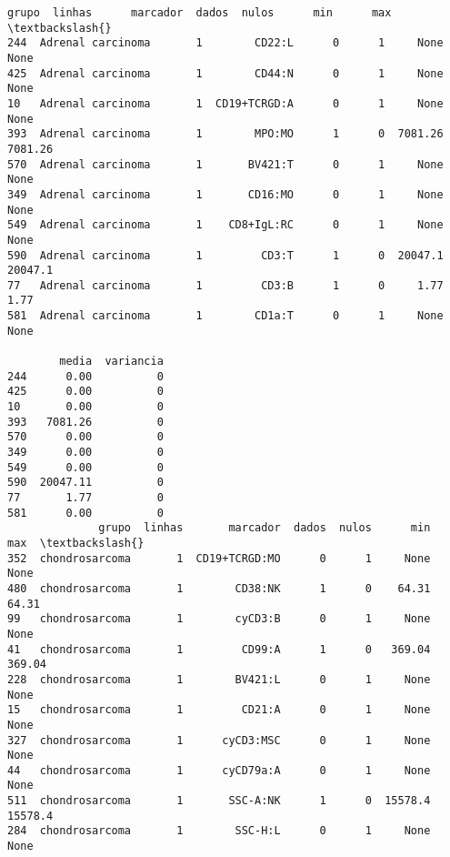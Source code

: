 \documentclass[11pt]{article}
\begin{document}
    \begin{Verbatim}[commandchars=\\\{\}]
                 grupo  linhas      marcador  dados  nulos      min      max  \textbackslash{}
244  Adrenal carcinoma       1        CD22:L      0      1     None     None   
425  Adrenal carcinoma       1        CD44:N      0      1     None     None   
10   Adrenal carcinoma       1  CD19+TCRGD:A      0      1     None     None   
393  Adrenal carcinoma       1        MPO:MO      1      0  7081.26  7081.26   
570  Adrenal carcinoma       1       BV421:T      0      1     None     None   
349  Adrenal carcinoma       1       CD16:MO      0      1     None     None   
549  Adrenal carcinoma       1    CD8+IgL:RC      0      1     None     None   
590  Adrenal carcinoma       1         CD3:T      1      0  20047.1  20047.1   
77   Adrenal carcinoma       1         CD3:B      1      0     1.77     1.77   
581  Adrenal carcinoma       1        CD1a:T      0      1     None     None   

        media  variancia  
244      0.00          0  
425      0.00          0  
10       0.00          0  
393   7081.26          0  
570      0.00          0  
349      0.00          0  
549      0.00          0  
590  20047.11          0  
77       1.77          0  
581      0.00          0  
              grupo  linhas       marcador  dados  nulos      min      max  \textbackslash{}
352  chondrosarcoma       1  CD19+TCRGD:MO      0      1     None     None   
480  chondrosarcoma       1        CD38:NK      1      0    64.31    64.31   
99   chondrosarcoma       1        cyCD3:B      0      1     None     None   
41   chondrosarcoma       1         CD99:A      1      0   369.04   369.04   
228  chondrosarcoma       1        BV421:L      0      1     None     None   
15   chondrosarcoma       1         CD21:A      0      1     None     None   
327  chondrosarcoma       1      cyCD3:MSC      0      1     None     None   
44   chondrosarcoma       1      cyCD79a:A      0      1     None     None   
511  chondrosarcoma       1       SSC-A:NK      1      0  15578.4  15578.4   
284  chondrosarcoma       1        SSC-H:L      0      1     None     None   


\end{Verbatim}
\end{document}
